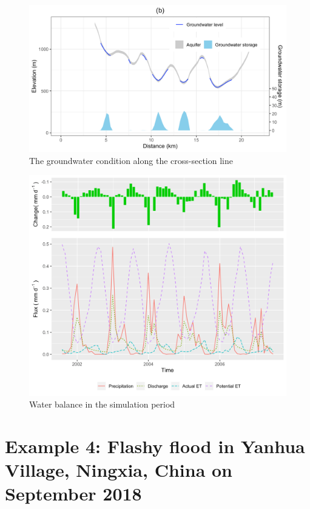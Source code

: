 \documentclass[]{scrbook}
\begin{document}
\begin{figure}
\centering
\includegraphics{Fig/Example/CacheCreek/sac5_sgw.png}
\caption{The groundwater condition along the cross-section line}
\end{figure}

\begin{figure}
\centering
\includegraphics{Fig/Example/CacheCreek/sac5_wb.png}
\caption{Water balance in the simulation period}
\end{figure}

\section{Example 4: Flashy flood in Yanhua Village, Ningxia, China on
September
2018}\label{example-4-flashy-flood-in-yanhua-village-ningxia-china-on-september-2018}
\end{document}
